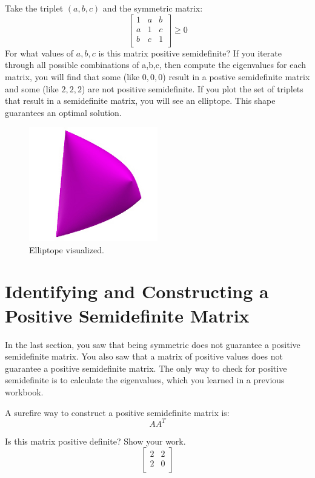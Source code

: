 Take the triplet $(a, b, c)$ and the symmetric matrix:
$$
\begin{bmatrix}
 1  & a & b  \\
 a  & 1 & c  \\
 b  & c & 1  \\
\end{bmatrix}
\geq 0
$$
For what values of $a, b, c$ is this matrix positive semidefinite? If you iterate through all possible combinations of a,b,c, then compute the eigenvalues for each matrix, you will find that some (like $0,0,0$) result in a postive semidefinite matrix and some (like $2, 2, 2 $) are not positive semidefinite. If you plot the set of triplets that result in a semidefinite matrix, you will see an elliptope. This shape guarantees an optimal solution.

\begin{figure}[htbp]
    \centering
    \includegraphics[width=0.5\textwidth]{elliptope.jpg}
    \caption{Elliptope visualized.}
    \label{fig:elliptope}
\end{figure}

\section{Identifying and Constructing a Positive Semidefinite Matrix}
In the last section, you saw that being symmetric does not guarantee a positive semidefinite matrix. You also saw that a matrix of positive values does not guarantee a positive semidefinite matrix. The only way to check for positive semidefinite is to calculate the eigenvalues, which you learned in a previous workbook.

A surefire way to construct a positive semidefinite matrix is:
$$AA^{T}$$

\begin{Exercise}[title={Figuring out if a matrix is positive semidefinite}, label=pos-matrix-01]
Is this matrix positive definite? Show your work.
$$
\begin{bmatrix}
 2  & 2 \\
 2  & 0 \\
\end{bmatrix}
$$
\end{Exercise}

